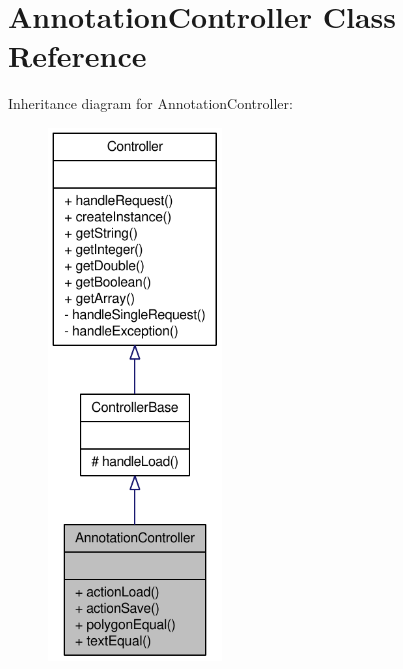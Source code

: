 \hypertarget{classAnnotationController}{
\section{AnnotationController Class Reference}
\label{classAnnotationController}
}


Inheritance diagram for AnnotationController:\nopagebreak
\begin{figure}[H]
\begin{center}
\leavevmode
\includegraphics[height=400pt]{classAnnotationController__inherit__graph}
\end{center}
\end{figure}


